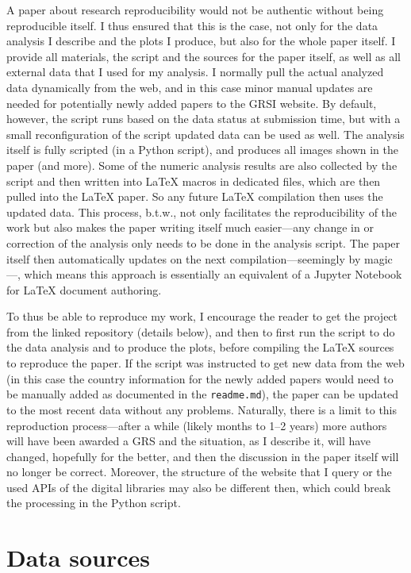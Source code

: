 \documentclass[conference]{vgtc}                     %
\begin{document}
A paper about research reproducibility would not be authentic without being reproducible itself. I thus ensured that this is the case, not only for the data analysis I describe and the plots I produce, but also for the whole paper itself. I provide all materials, the script and the sources for the paper itself, as well as all external data that I used for my analysis. I normally pull the actual analyzed data dynamically from the web, and in this case minor manual updates are needed for potentially newly added papers to the GRSI website. By default, however, the script runs based on the data status at submission time, but with a small reconfiguration of the script updated data can be used as well. The analysis itself is fully scripted (in a Python script), and produces all images shown in the paper (and more). Some of the numeric analysis results are also collected by the script and then written into \LaTeX{} macros in dedicated files, which are then pulled into the \LaTeX{} paper. So any future \LaTeX{} compilation then uses the updated data. This process, b.t.w., not only facilitates the reproducibility of the work but also makes the paper writing itself much easier---any change in or correction of the analysis only needs to be done in the analysis script. The paper itself then automatically updates on the next compilation---seemingly by magic---, which means this approach is essentially an equivalent of a Jupyter Notebook for \LaTeX{} document authoring.

To thus be able to reproduce my work, I encourage the reader to get the project from the linked repository (details below), and then to first run the script to do the data analysis and to produce the plots, before compiling the \LaTeX{} sources to reproduce the paper. If the script was instructed to get new data from the web (in this case the country information for the newly added papers would need to be manually added as documented in the \texttt{readme.md}), the paper can be updated to the most recent data without any problems. Naturally, there is a limit to this reproduction process---after a while (likely months to 1--2 years) more authors will have been awarded a GRS and the situation, as I describe it, will have changed, hopefully for the better, and then the discussion in the paper itself will no longer be correct. Moreover, the structure of the website that I query or the used APIs of the digital libraries may also be different then, which could break the processing in the Python script.

\section*{Data sources}
\label{sec:data_sources}
\end{document}
